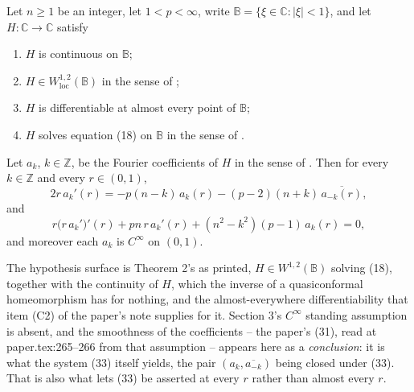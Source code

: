 \begin{lemma}
Let $n\ge1$ be an integer, let $1<p<\infty$, write
$\mathbb{B}=\{\xi\in\mathbb{C}:|\xi|<1\}$, and let
$H\colon\mathbb{C}\to\mathbb{C}$ satisfy
\begin{enumerate}
\item[(H1)] $H$ is continuous on $\mathbb{B}$;
\item[(H2)] $H\in W^{1,2}_{\mathrm{loc}}(\mathbb{B})$ in the sense of
  ;
\item[(H3)] $H$ is differentiable at almost every point of $\mathbb{B}$;
\item[(H4)] $H$ solves equation (18) on $\mathbb{B}$ in the sense of
  .
\end{enumerate}
Let $a_k$, $k\in\mathbb{Z}$, be the Fourier coefficients of $H$ in the sense of
.  Then for every $k\in\mathbb{Z}$ and every
$r\in(0,1)$,
\begin{equation*}\tag{33}
  2r\,a_k'(r)=-p(n-k)\,a_k(r)-(p-2)(n+k)\,\overline{a_{-k}(r)},
\end{equation*}
and
\begin{equation*}\tag{35}
  r\bigl(r\,a_k'\bigr)'(r)+pn\,r\,a_k'(r)+(n^2-k^2)(p-1)\,a_k(r)=0 ,
\end{equation*}
and moreover each $a_k$ is $C^\infty$ on $(0,1)$.

The hypothesis surface is Theorem 2's as printed, $H\in W^{1,2}(\mathbb{B})$
solving (18), together with the continuity of $H$, which the inverse of a
quasiconformal homeomorphism has for nothing, and the almost-everywhere
differentiability that item (C2) of the paper's note supplies for it.
Section 3's $C^\infty$ standing assumption is absent, and the smoothness of the
coefficients -- the paper's (31), read at paper.tex:265--266 from that
assumption -- appears here as a \emph{conclusion}: it is what the system (33)
itself yields, the pair $(a_k,\overline{a_{-k}})$ being closed under (33).  That
is also what lets (33) be asserted at every $r$ rather than almost every $r$.
\end{lemma}
